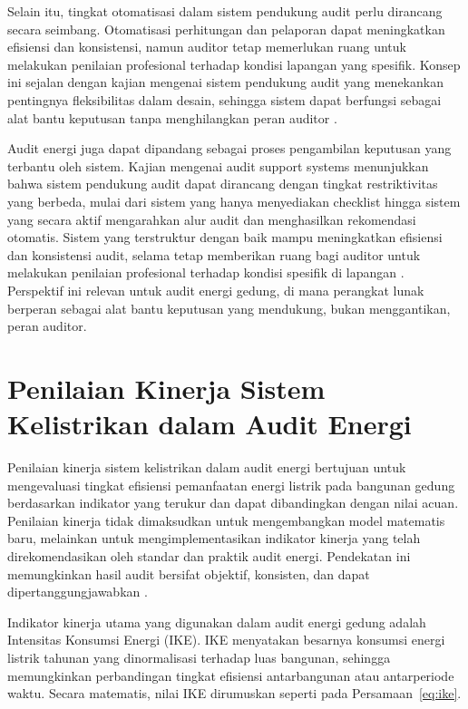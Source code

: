 Selain itu, tingkat otomatisasi dalam sistem pendukung audit perlu dirancang secara seimbang. Otomatisasi perhitungan dan pelaporan dapat meningkatkan efisiensi dan konsistensi, namun auditor tetap memerlukan ruang untuk melakukan penilaian profesional terhadap kondisi lapangan yang spesifik. Konsep ini sejalan dengan kajian mengenai sistem pendukung audit yang menekankan pentingnya fleksibilitas dalam desain, sehingga sistem dapat berfungsi sebagai alat bantu keputusan tanpa menghilangkan peran auditor \cite{dowling2007audit}.

Audit energi juga dapat dipandang sebagai proses pengambilan keputusan yang terbantu oleh sistem. Kajian mengenai audit support systems menunjukkan bahwa sistem pendukung audit dapat dirancang dengan tingkat restriktivitas yang berbeda, mulai dari sistem yang hanya menyediakan checklist hingga sistem yang secara aktif mengarahkan alur audit dan menghasilkan rekomendasi otomatis. Sistem yang terstruktur dengan baik mampu meningkatkan efisiensi dan konsistensi audit, selama tetap memberikan ruang bagi auditor untuk melakukan penilaian profesional terhadap kondisi spesifik di lapangan \cite{dowling2007audit}. Perspektif ini relevan untuk audit energi gedung, di mana perangkat lunak berperan sebagai alat bantu keputusan yang mendukung, bukan menggantikan, peran auditor.

\section{Penilaian Kinerja Sistem Kelistrikan dalam Audit Energi}
Penilaian kinerja sistem kelistrikan dalam audit energi bertujuan untuk mengevaluasi tingkat efisiensi pemanfaatan energi listrik pada bangunan gedung berdasarkan indikator yang terukur dan dapat dibandingkan dengan nilai acuan. Penilaian kinerja tidak dimaksudkan untuk mengembangkan model matematis baru, melainkan untuk mengimplementasikan indikator kinerja yang telah direkomendasikan oleh standar dan praktik audit energi. Pendekatan ini memungkinkan hasil audit bersifat objektif, konsisten, dan dapat dipertanggungjawabkan \cite{iso2014_50002,sni2000_036196}.

Indikator kinerja utama yang digunakan dalam audit energi gedung adalah Intensitas Konsumsi Energi (IKE). IKE menyatakan besarnya konsumsi energi listrik tahunan yang dinormalisasi terhadap luas bangunan, sehingga memungkinkan perbandingan tingkat efisiensi antarbangunan atau antarperiode waktu. Secara matematis, nilai IKE dirumuskan seperti pada Persamaan~\ref{eq:ike}.

